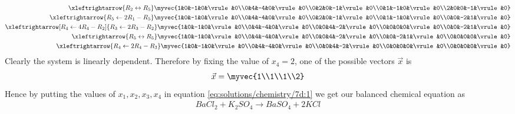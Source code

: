 \begin{align}
\xleftrightarrow{R_2 \leftrightarrow R_5}\myvec{1&0&-1&0&\vrule&0\\0&4&-4&0&\vrule&0\\0&2&0&-1&\vrule&0\\0&1&-1&0&\vrule&0\\2&0&0&-1&\vrule&0}\\
\xleftrightarrow{R_5 \leftarrow 2R_1-R_5}\myvec{1&0&-1&0&\vrule&0\\0&4&-4&0&\vrule&0\\0&2&0&-1&\vrule&0\\0&1&-1&0&\vrule&0\\0&0&-2&1&\vrule&0}\\
\xleftrightarrow[R_4 \leftarrow 4R_4-R_2]{R_3 \leftarrow 2R_3-R_2}\myvec{1&0&-1&0&\vrule&0\\0&4&-4&0&\vrule&0\\0&0&4&-2&\vrule&0\\0&0&0&0&\vrule&0\\0&0&-2&1&\vrule&0}\\
\xleftrightarrow{R_5 \leftrightarrow R_5}\myvec{1&0&-1&0&\vrule&0\\0&4&-4&0&\vrule&0\\0&0&4&-2&\vrule&0\\0&0&-2&1&\vrule&0\\0&0&0&0&\vrule&0}\\
\xleftrightarrow{R_4 \leftarrow 2R_4-R_3}\myvec{1&0&-1&0&\vrule&0\\0&4&-4&0&\vrule&0\\0&0&4&-2&\vrule&0\\0&0&0&0&\vrule&0\\0&0&0&0&\vrule&0}
\end{align}
Clearly the system is linearly dependent. Therefore by fixing the value of $x_4=2$, one of the possible vectors $\vec{x}$ is
\begin{align}
    \vec{x}=\myvec{1\\1\\1\\2}
\end{align}
Hence by putting the values of $x_1,x_2,x_3,x_4$ in equation \eqref{eq:solutions/chemistry/7d:1} we get our balanced chemical equation as 
\begin{align}
BaCl_2 + K_2SO_4 \rightarrow BaSO_4 + 2KCl
\end{align}


